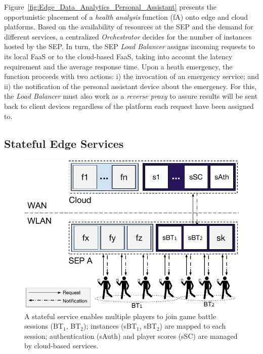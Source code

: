 Figure~\ref{fig:Edge_Data_Analytics_Personal_Assistant} presents the opportunistic placement of a \textit{health analysis} function (fA) onto edge and cloud platforms. Based on the availability of resources at the SEP and the demand for different services, a centralized \textit{Orchestrator} decides for the number of instances hosted by the SEP. In turn, the SEP \textit{Load Balancer} assigns incoming requests to its local FaaS or to the cloud-based FaaS, taking into account the latency requirement and the average response time. Upon a heath emergency, the function proceeds with two actions: i) the invocation of an emergency service; and ii) the notification of the personal assistant device about the emergency. For this, the \textit{Load Balancer} must also work as a \textit{reverse proxy} to assure results will be sent back to client devices regardless of the platform each request have been assigned to.




\subsection{Stateful Edge Services}

\begin{figure}[tbp]
	\centering
	\includegraphics[width=\linewidth]{Figs/Stateful_Edge_Services.pdf}
	\caption{A stateful service enables multiple players to join game battle sessions (BT$_1$, BT$_2$); instances (sBT$_1$, sBT$_2$) are mapped to each session; authentication (sAuth) and player scores (sSC) are managed by cloud-based services.}
	\label{fig:Steteful_Edge_MMG}
\end{figure}

